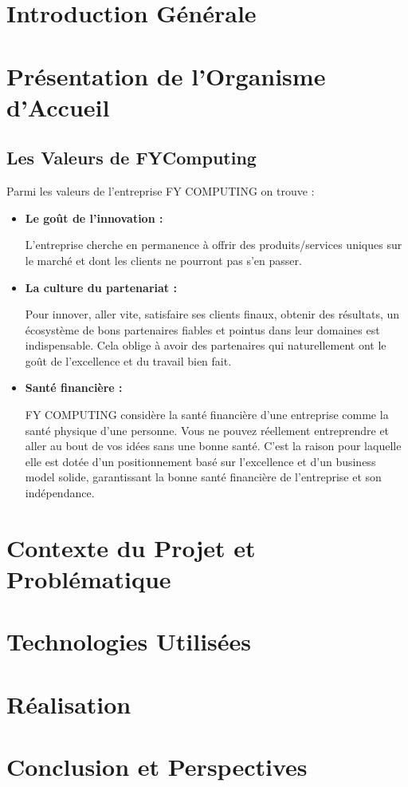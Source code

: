 \documentclass[a4paper,11pt,oneside]{report}
\begin{document}
\newpage

\chapter*{Introduction Générale}

\newpage

\chapter{Présentation de l'Organisme d'Accueil}

\newpage

\section{Les Valeurs de FYComputing}
Parmi les valeurs de l’entreprise FY COMPUTING on trouve : 

\begin{itemize}
\item \textbf{Le goût de l’innovation :}

L’entreprise cherche en permanence à offrir des produits/services uniques sur le marché et dont les clients ne pourront pas s’en passer.


\item \textbf{La culture du partenariat :}

Pour innover, aller vite, satisfaire ses clients finaux, obtenir des résultats, un écosystème de bons partenaires fiables et pointus dans leur domaines est indispensable. Cela oblige à avoir des partenaires qui naturellement ont le goût de l’excellence et du travail bien fait.


\item \textbf{Santé financière :}

FY COMPUTING considère la santé financière d’une entreprise comme la santé physique d’une personne. Vous ne pouvez réellement entreprendre et aller au bout de vos idées sans une bonne santé. C’est la raison pour laquelle elle est dotée d’un positionnement basé sur l’excellence et d’un business model solide, garantissant la bonne santé financière de l’entreprise et son indépendance.
\end{itemize}

\newpage

\chapter{Contexte du Projet et Problématique}

\newpage

\chapter{Technologies Utilisées}

\newpage

\chapter{Réalisation}

\newpage

\chapter*{Conclusion et Perspectives}
\end{document}
